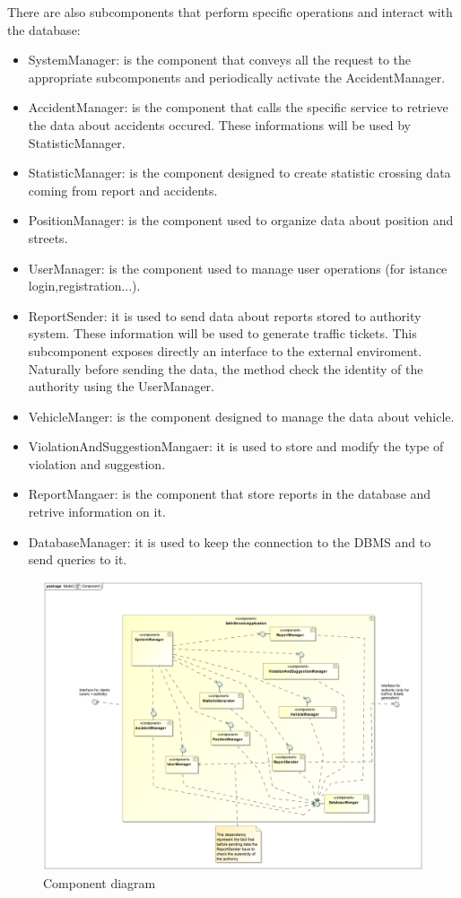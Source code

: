 There are also subcomponents that perform specific operations and interact with the database:
\begin{itemize}
 \item 
 SystemManager: is the component that conveys all the request to the appropriate subcomponents and periodically activate the AccidentManager.
 \item 
 AccidentManager: is the component that calls the specific service to retrieve the data about accidents occured. These informations will be used by StatisticManager.
 \item
 StatisticManager: is the component designed to create statistic crossing data coming from report and accidents.
 \item 
 PositionManager: is the component used to organize data about position and streets.
 \item 
 UserManager: is the component used to manage user operations (for istance login,registration...).
 \item
 ReportSender: it is used to send data about reports stored to authority system. These information will be used to generate traffic tickets. This subcomponent exposes directly an interface to the external enviroment. Naturally before sending the data, the method check the identity of the authority using the UserManager.
 \item 
 VehicleManger: is the component designed to manage the data about vehicle.
 \item 
 ViolationAndSuggestionMangaer: it is used to store and modify the type of violation and suggestion.
 \item 
 ReportMangaer: is the component that store reports in the database and retrive information on it.
 \item 
 DatabaseManager: it is used to keep the connection to the DBMS and to send queries to it. 
 
\end{itemize}

\begin{figure}[H]
	\centering
	\includegraphics[width=1.12\linewidth]{Images/component.png}
	\caption{Component diagram}
\end{figure}

